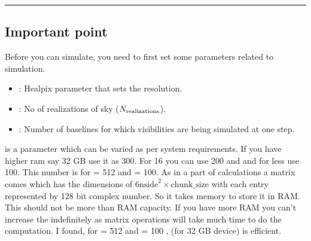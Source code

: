 \documentclass[a4paper,11pt,oneside,english,openany]{sphinxmanual}
\begin{document}
\bigskip\hrule\bigskip



\subsection{Important point}
\label{\detokenize{simvis:important-point}}
\sphinxAtStartPar
Before you can simulate, you need to first set some parameters related to simulation.
\begin{itemize}
\item {} 
\sphinxAtStartPar
{} : Healpix parameter that sets the resolution.

\item {} 
\sphinxAtStartPar
{} : No of realizations of sky (\(N_{\rm realizations}\)).

\item {} 
\sphinxAtStartPar
{} : Number of baselines for which visibilities are being simulated at one step.

\end{itemize}

\sphinxAtStartPar
{} is a parameter which can be varied as per system requirements. If you have higher ram say 32 GB use it as 300. For 16 you can use 200 and and for less use 100. This number is for  = 512 and  = 100. As in a part of calculations a matrix comes which has the dimensions of  \(6\text{nside}^2 \times \text{chunk\_size}\) with each entry represented by 128 bit complex number. So it takes memory to store it in RAM. This should not be more than RAM capacity. If you have more RAM you can’t increase the  indefinitely as matrix operations will take much time to do the computation. I found, for  = 512 and  = 100 ,  (for 32 GB device) is efficient.

\sphinxAtStartPar
{}

\begin{sphinxVerbatim}[commandchars=\\\{\}]
    
    
 
           
            
      
\end{sphinxVerbatim}
\end{document}
